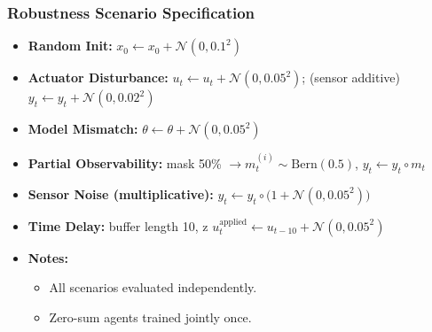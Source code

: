 \begin{frame}
  \frametitle{Robustness Scenario Specification}
  \small
  \begin{itemize}
    \item \textbf{Random Init:} $x_0 \leftarrow x_0 + \mathcal{N}(0,0.1^2)$
    \item \textbf{Actuator Disturbance:} $u_t \leftarrow u_t + \mathcal{N}(0,0.05^2)$; (sensor additive) $y_t \leftarrow y_t + \mathcal{N}(0,0.02^2)$
    \item \textbf{Model Mismatch:} $\theta \leftarrow \theta + \mathcal{N}(0,0.05^2)$
    \item \textbf{Partial Observability:} mask 50\% $\to m_t^{(i)}\sim \mathrm{Bern}(0.5)$, $y_t \leftarrow y_t \circ m_t$
    \item \textbf{Sensor Noise (multiplicative):} $y_t \leftarrow y_t \circ \bigl(1 + \mathcal{N}(0,0.05^2)\bigr)$
    \item \textbf{Time Delay:} buffer length 10, z
      $u_t^{\mathrm{applied}} \leftarrow u_{t-10} + \mathcal{N}(0,0.05^2)$
    \item \textbf{Notes:}
      \begin{itemize}
        \small
        \setlength{\itemsep}{1pt}
        \item All scenarios evaluated independently.
        \item Zero-sum agents trained jointly once.
      \end{itemize}
  \end{itemize}
  \vspace{2pt}
\end{frame}



  
